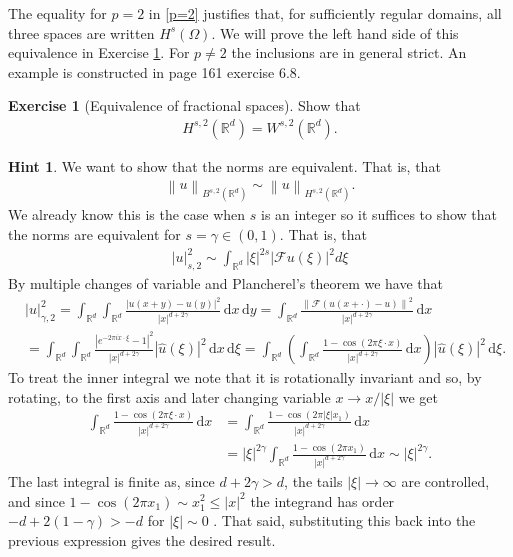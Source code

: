 \documentclass[
    a4paper,
    DIV=14,
    abstract=true,
    numbers=noenddot
]
{scrartcl}
\theoremstyle{definition}
\newtheorem{exercise}{Exercise}
\newtheorem*{hint}{Hint}
\newcommand{\wh}[1]{\widehat{#1}}
\renewcommand{\norm}[1]{\left\lVert #1 \right\rVert}\renewcommand{\abs}[1]{\left| #1 \right|}
\renewcommand{\d}{\,\mathrm{d}}\newcommand{\dx}{\,\mathrm{d}x}
\newcommand{\R}{\mathbb{R}}
\newcommand{\Ff}{\mathcal{F}}
\begin{document}
The equality for $p=2$ in \eqref{p=2} justifies that, for sufficiently regular domains, all three spaces are written $H^s(\Omega )$.   We will prove the left hand side of this equivalence in Exercise \ref{equivalence of fractional spaces}. For $p\neq 2$ the inclusions are in general strict. An example is constructed in \cite{stein1970singular} page 161 exercise 6.8.
\begin{exercise}[Equivalence of fractional spaces]\label{equivalence of fractional spaces}
    Show that
    \begin{align*}
        H^{s,2}(\R^d)=W^{s,2}(\R^d).
    \end{align*}
\end{exercise}
\begin{hint}
    We want to show that the norms are equivalent. That is, that
    \begin{align*}
        \norm{u}_{B^{s,2}(\R^d)}\sim \norm{u}_{H^{s,2}(\R^d)}.
    \end{align*}
    We already know this is the case when $s$ is an integer so it suffices to show that the norms are equivalent for $s= \gamma  \in (0,1)$. That is, that
    \begin{align*}
        |u|_{s,2}^2\sim \int_{\mathbb{R}^d}|\xi|^{2 s}|\mathcal{F} u(\xi)|^2 d \xi
    \end{align*}
    By multiple changes of variable and Plancherel's theorem we have that
    \begin{align*}
         & |u|_{\gamma ,2}^2  =\int_{\R^d}\int_{\R^d}\frac{\abs{u(x+y)-u(y)}^2}{\abs{x}^{d+2\gamma	}}\d x \d y                                                                                                       = \int_{\R^d}\frac{\norm{\Ff (u(x+\cdot )-u)}^2}{\abs{x}^{d+2\gamma	}}\d x \\
         & =\int_{\R^d}\int_{\R^d}  \frac{|e^{-2 \pi i x \cdot \xi}-1|^2}{\abs{x}^{d+2\gamma	}}|\wh{u}(\xi)|^2\d x\d\xi =\int_{\R^d}\left(\int_{\R^d}  \frac{1-\cos(2\pi \xi\cdot x)}{\abs{x}^{d+2\gamma	}}\d x\right)|\wh{u}(\xi)|^2\d\xi.
    \end{align*}
    To treat the inner integral we note that it is rotationally invariant and so, by rotating, to the first axis and later changing variable $x \to x / \abs{\xi}$ we get
    \begin{align*}
        \int_{\R^d}  \frac{1-\cos(2\pi \xi\cdot x)}{\abs{x}^{d+2\gamma	}}\d x & =\int_{\R^d}  \frac{1-\cos(2\pi \abs{\xi}x_1 )}{\abs{x}^{d+2\gamma	}}\d x                                          \\
                                                                              & =\abs{\xi}^{2 \gamma } \int_{\R^d}  \frac{1-\cos(2\pi  x_1) }{\abs{x}^{d+2\gamma	}}\d x\sim \abs{\xi}^{2 \gamma }.
    \end{align*}
    The last integral is finite as, since $d+2\gamma >d$, the tails $\abs{\xi}\to\infty$ are controlled, and since $1-\cos(2\pi x_1)\sim x_1^2\leq \abs{x}^2$ the integrand has order $-d+2(1-\gamma)>-d$ for $\abs{\xi}\sim 0$ . That said, substituting this back into the previous expression gives the desired result.
\end{hint}
\end{document}
